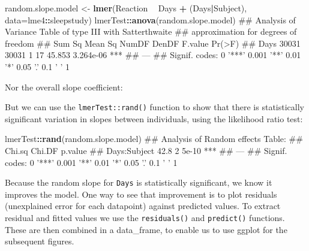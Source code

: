 \documentclass[]{article}
\newenvironment{Shaded}{\begin{snugshade}}{\end{snugshade}}
\newcommand{\KeywordTok}[1]{\textcolor[rgb]{0.13,0.29,0.53}{\textbf{#1}}}
\newcommand{\DataTypeTok}[1]{\textcolor[rgb]{0.13,0.29,0.53}{#1}}
\newcommand{\StringTok}[1]{\textcolor[rgb]{0.31,0.60,0.02}{#1}}
\newcommand{\OperatorTok}[1]{\textcolor[rgb]{0.81,0.36,0.00}{\textbf{#1}}}
\newcommand{\NormalTok}[1]{#1}
\theoremstyle{definition}
\theoremstyle{definition}
\theoremstyle{definition}
\theoremstyle{remark}
\begin{document}
\begin{Shaded}
\begin{Highlighting}[]
\NormalTok{random.slope.model <-}\StringTok{ }\KeywordTok{lmer}\NormalTok{(Reaction }\OperatorTok{~}\StringTok{ }\NormalTok{Days }\OperatorTok{+}\StringTok{ }\NormalTok{(Days}\OperatorTok{|}\NormalTok{Subject),  }\DataTypeTok{data=}\NormalTok{lme4}\OperatorTok{::}\NormalTok{sleepstudy)}
\NormalTok{lmerTest}\OperatorTok{::}\KeywordTok{anova}\NormalTok{(random.slope.model)}
\NormalTok{## Analysis of Variance Table of type III  with  Satterthwaite }
\NormalTok{## approximation for degrees of freedom}
\NormalTok{##      Sum Sq Mean Sq NumDF DenDF F.value    Pr(>F)    }
\NormalTok{## Days  30031   30031     1    17  45.853 3.264e-06 ***}
\NormalTok{## ---}
\NormalTok{## Signif. codes:  0 '***' 0.001 '**' 0.01 '*' 0.05 '.' 0.1 ' ' 1}
\end{Highlighting}
\end{Shaded}

Nor the overall slope coefficient:

\begin{Shaded}
\end{Shaded}

But we can use the \texttt{lmerTest::rand()} function to show that there
is statistically significant variation in slopes between individuals,
using the likelihood ratio test:

\begin{Shaded}
\begin{Highlighting}[]
\NormalTok{lmerTest}\OperatorTok{::}\KeywordTok{rand}\NormalTok{(random.slope.model)}
\NormalTok{## Analysis of Random effects Table:}
\NormalTok{##              Chi.sq Chi.DF p.value    }
\NormalTok{## Days:Subject   42.8      2   5e-10 ***}
\NormalTok{## ---}
\NormalTok{## Signif. codes:  0 '***' 0.001 '**' 0.01 '*' 0.05 '.' 0.1 ' ' 1}
\end{Highlighting}
\end{Shaded}

Because the random slope for \texttt{Days} is statistically significant,
we know it improves the model. One way to see that improvement is to
plot residuals (unexplained error for each datapoint) against predicted
values. To extract residual and fitted values we use the
\texttt{residuals()} and \texttt{predict()} functions. These are then
combined in a data\_frame, to enable us to use ggplot for the subsequent
figures.
\end{document}
